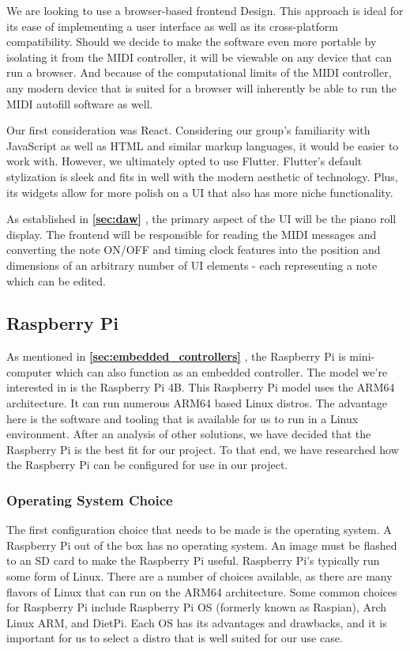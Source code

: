 We are looking to use a browser-based frontend Design. This approach is ideal for its ease of
implementing a user interface as well as its cross-platform compatibility. Should we decide to
make the software even more portable by isolating it from the MIDI controller, it will be viewable
on any device that can run a browser. And because of the computational limits of the MIDI
controller, any modern device that is suited for a browser will inherently be able to run the
MIDI autofill software as well.

Our first consideration was React. Considering our group's familiarity with JavaScript as well as
HTML and similar markup languages, it would be easier to work with. However, we ultimately opted to
use Flutter. Flutter's default stylization is sleek and fits in well with the modern aesthetic of
technology. Plus, its widgets allow for more polish on a UI that also has more niche functionality.

As established in \textbf{\ref{sec:daw} }, the primary aspect of the UI will be the piano roll display.
The frontend will be responsible for reading the MIDI messages and converting the note ON/OFF and
timing clock features into the position and dimensions of an arbitrary number of UI elements -
each representing a note which can be edited.

\subsection{Raspberry Pi}

As mentioned in \textbf{\ref{sec:embedded_controllers} }, the Raspberry Pi is mini-computer
which can also function as an embedded controller. The model we're interested in is the
Raspberry Pi 4B. This Raspberry Pi model uses the ARM64 architecture. It can run numerous
ARM64 based Linux distros. The advantage here is the software and tooling that is
available for us to run in a Linux environment. After an analysis of other solutions, we
have decided that the Raspberry Pi is the best fit for our project. To that end, we have
researched how the Raspberry Pi can be configured for use in our project.

\subsubsection{Operating System Choice}

The first configuration choice that needs to be made is the operating system. A Raspberry
Pi out of the box has no operating system. An image must be flashed to an SD card to make
the Raspberry Pi useful. Raspberry Pi's typically run some form of Linux. There are a
number of choices available, as there are many flavors of Linux that can run on the ARM64
architecture. Some common choices for Raspberry Pi include Raspberry Pi OS (formerly known
as Raspian), Arch Linux ARM, and DietPi. Each OS has its advantages and drawbacks, and it
is important for us to select a distro that is well suited for our use case.

